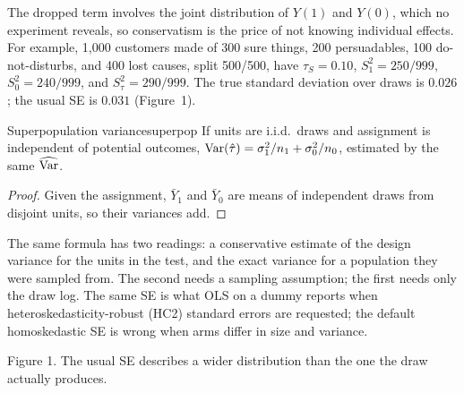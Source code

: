 \documentclass[11pt]{article}
\begin{document}
The dropped term involves the joint distribution of $Y(1)$ and $Y(0)$, which no experiment reveals, so
conservatism is the price of not knowing individual effects. For example, 1{,}000 customers made of 300 sure
things, 200 persuadables, 100 do-not-disturbs, and 400 lost causes, split 500/500, have $\tau_S = 0.10$,
$S_1^2 = 250/999$, $S_0^2 = 240/999$, and $S_\tau^2 = 290/999$. The true standard deviation over draws is
$0.026$; the usual SE is $0.031$ (Figure~1).

\begin{prop}{Superpopulation variance}{superpop}
If units are i.i.d.\ draws and assignment is independent of potential outcomes,
$\operatorname{Var}(\hat{\tau}) = \sigma_1^2/n_1 + \sigma_0^2/n_0$, estimated by the same $\widehat{\operatorname{Var}}$.
\end{prop}
\begin{proof}
Given the assignment, $\bar Y_1$ and $\bar Y_0$ are means of independent draws from disjoint units, so their
variances add.
\end{proof}

The same formula has two readings: a conservative estimate of the design variance for the units in the test, and
the exact variance for a population they were sampled from. The second needs a sampling assumption; the
first needs only the draw log. The same SE is what OLS on a dummy reports when heteroskedasticity-robust
(HC2) standard errors are requested; the default homoskedastic SE is wrong when arms differ in size and
variance.

\begin{center}

\small Figure 1. The usual SE describes a wider distribution than the one the draw actually produces.
\end{center}
\end{document}
